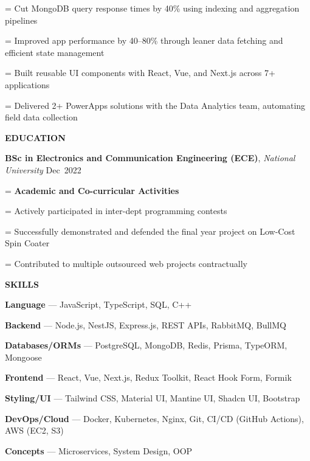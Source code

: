 \documentclass[a4paper]{article}
\newcommand{\sectionfont}{%
  \fontsize{12pt}{14pt}\selectfont\bfseries
}
\newlength{\secondaryindent}
\newlength{\listindent}
\newcommand{\sectiontitle}[1]{%
  \par
  \vspace{14pt}
  {\sectionfont #1}\par
  \vspace{6pt}
}
\newlength{\bulletgap}
\newcommand{\resumebullet}[1]{%
  \begingroup
  \leftskip=\listindent
  \parindent=0pt
  \noindent
  \llap{%
    \raisebox{0.15ex}{%
      \fontsize{7}{7}\selectfont -
    }%
    \hspace{6pt}%
  }%
  #1\par
  \endgroup
  \vspace{\bulletgap}%
}
\newcommand{\secondaryline}[1]{%
  \par
  \begingroup
  \leftskip=\secondaryindent
  \noindent
  #1\par
  \endgroup
}
\newcommand{\skill}[2]{%
  \textbf{#1} --- #2\par
  \vspace{3pt}%
}
\begin{document}
\resumebullet{Cut MongoDB query response times by 40\% using indexing and aggregation pipelines}

\resumebullet{Improved app performance by 40--80\% through leaner data fetching and efficient state management}

\resumebullet{Built reusable UI components with React, Vue, and Next.js across 7+ applications}

\resumebullet{Delivered 2+ PowerApps solutions with the Data Analytics team, automating field data collection}


\sectiontitle{EDUCATION}

\textbf{BSc in Electronics and Communication Engineering (ECE)},
\textit{National University}%
\hfill
\mbox{Dec 2022}\par

\secondaryline{\textbf{Academic and Co-curricular Activities}}

\vspace{1pt}

\resumebullet{Actively participated in inter-dept programming contests}

\resumebullet{Successfully demonstrated and defended the final year project on Low-Cost Spin Coater}

\resumebullet{Contributed to multiple outsourced web projects contractually}


\sectiontitle{SKILLS}

\skill{Language}{JavaScript, TypeScript, SQL, C++}

\skill{Backend}{Node.js, NestJS, Express.js, REST APIs, RabbitMQ, BullMQ}

\skill{Databases/ORMs}{PostgreSQL, MongoDB, Redis, Prisma, TypeORM, Mongoose}

\skill{Frontend}{React, Vue, Next.js, Redux Toolkit, React Hook Form, Formik}

\skill{Styling/UI}{Tailwind CSS, Material UI, Mantine UI, Shadcn UI, Bootstrap}

\skill{DevOps/Cloud}{Docker, Kubernetes, Nginx, Git, CI/CD (GitHub Actions), AWS (EC2, S3)}

\skill{Concepts}{Microservices, System Design, OOP}
\end{document}
